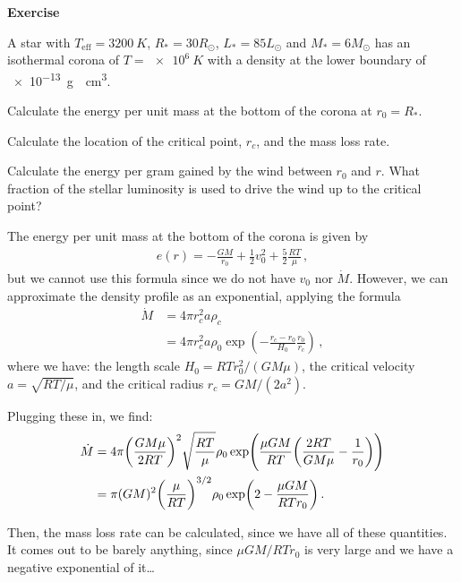 \documentclass[main.tex]{subfiles}
\begin{document}
\begin{greenbox}
    \textbf{Exercise}

  A star with \(T _{\text{eff}} = \SI{3200}{K}\), \(R_{*} = 30 R_{\odot}\), \(L_{*} = 85 L_{\odot}\) and \(M_{*} = 6 M_{\odot}\) has an isothermal corona of \(T = \SI{e6}{K}\) with a density at the lower boundary of \SI{e-13}{g \per\centi\metre\cubed}.

  Calculate the energy per unit mass at the bottom of the corona at \(r_0 = R_{*}\).

  Calculate the location of the critical point, \(r_c\), and the mass loss rate.

  Calculate the energy per gram gained by the wind between \(r_0 \) and \(r\). What fraction of the stellar luminosity is used to drive the wind up to the critical point?
\end{greenbox}

\begin{bluebox}
  The energy per unit mass at the bottom of the corona is given by 
  \begin{align}
    e(r) = - \frac{GM}{r_0 } + \frac{1}{2} v_0^2 + \frac{5}{2} \frac{RT}{\mu }
  \,,
  \end{align}
but we cannot use this formula since we do not have \(v_0 \) nor \(\dot{M}\). However, we can approximate the density profile as an exponential, applying the formula 
%
\begin{subequations}
\begin{align}
  \dot{M} &= 4 \pi r_c^2 a \rho_{c}  \\
  &= 4 \pi r_c^2 a \rho_0 \exp(- \frac{r_c - r_0 }{H_0 } \frac{r_0 }{r_c})  
\,,
\end{align}
\end{subequations}
%
where we have: the length scale \(H_0 = RT r_0^2 / (GM \mu )\), the critical velocity \(a = \sqrt{RT/\mu }\), and the critical radius \(r_c = GM/(2a^2)\).

Plugging these in, we find: 
%
\begin{align}
  \dot{M} &= 4 \pi \qty(\frac{GM \mu }{2 RT})^2 \sqrt{\frac{RT}{\mu }} \rho_0 
  \exp(\frac{\mu GM}{RT} \qty(\frac{2RT}{GM \mu } - \frac{1}{r_0 }))  \\
  &= \pi (GM)^2 \qty(\frac{\mu }{RT})^{3/2} \rho_0 
  \exp(2 - \frac{\mu GM}{RT r_0 })
\,.
\end{align}
%

Then, the mass loss rate can be calculated, since we have all of these quantities. It comes out to be barely anything, since \(\mu GM / RT r_0 \) is very large and we have a negative exponential of it\dots

\end{bluebox}
\end{document}
